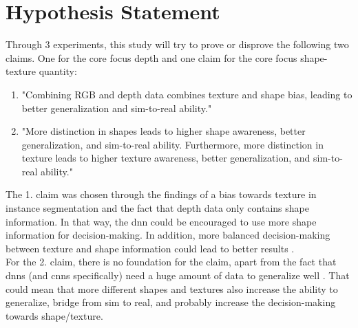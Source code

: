 	\section{Hypothesis Statement}
	\label{sec:hypothesis-statement}	
		Through 3 experiments, this study will try to prove or disprove the following two claims. One for the core focus depth and one claim for the core focus shape-texture quantity: 
		\begin{enumerate}
			\item "Combining RGB and depth data combines texture and shape bias, leading to better generalization and sim-to-real ability." %
			\item "More distinction in shapes leads to higher shape awareness, better generalization, and sim-to-real ability. Furthermore, more distinction in texture leads to higher texture awareness, better generalization, and sim-to-real ability."
		\end{enumerate}
		The 1. claim was chosen through the findings of a bias towards texture in instance segmentation \cite{Theodoridis2022} and the fact that depth data only contains shape information. In that way, the \ac{dnn} could be encouraged to use more shape information for decision-making. In addition, more balanced decision-making between texture and shape information could lead to better results \cite{Li2021}\cite{Co2021}\cite{Chung2023}.\\
		For the 2. claim, there is no foundation for the claim, apart from the fact that \ac{dnn}s (and \ac{cnn}s specifically) need a huge amount of data to generalize well \cite{Cho2016}\cite{Luca2022}. That could mean that more different shapes and textures also increase the ability to generalize, bridge from sim to real, and probably increase the decision-making towards shape/texture.
	
	



			